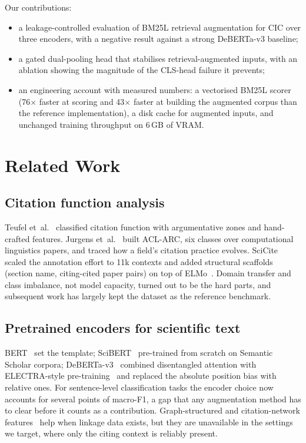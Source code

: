 \documentclass[10pt,twocolumn,twoside]{article}
\begin{document}
Our contributions:
\begin{itemize}
  \item a leakage-controlled evaluation of BM25L retrieval augmentation for
        CIC over three encoders, with a negative result against a strong
        DeBERTa-v3 baseline;
  \item a gated dual-pooling head that stabilises retrieval-augmented inputs,
        with an ablation showing the magnitude of the CLS-head failure it
        prevents;
  \item an engineering account with measured numbers: a vectorised BM25L
        scorer (76$\times$ faster at scoring and 43$\times$ faster at building
        the augmented corpus than the reference implementation), a disk cache
        for augmented inputs, and unchanged training throughput on 6\,GB of
        VRAM.
\end{itemize}

\section{Related Work}\label{sec:related}

\subsection{Citation function analysis}
Teufel et~al.~\cite{teufel2006} classified citation function with
argumentative zones and hand-crafted features. Jurgens et~al.~\cite{jurgens2018}
built ACL-ARC, six classes over computational linguistics papers, and traced
how a field's citation practice evolves. SciCite~\cite{cohan2019} scaled the
annotation effort to 11k contexts and added structural scaffolds (section
name, citing-cited paper pairs) on top of ELMo~\cite{peters2018}. Domain
transfer and class imbalance, not model capacity, turned out to be the hard
parts, and subsequent work has largely kept the dataset as the reference
benchmark.

\subsection{Pretrained encoders for scientific text}
BERT~\cite{devlin2019} set the template; SciBERT~\cite{beltagy2019} pre-trained
from scratch on Semantic Scholar corpora; DeBERTa-v3~\cite{he2021} combined
disentangled attention with ELECTRA-style pre-training~\cite{clark2020} and
replaced the absolute position bias with relative ones. For sentence-level
classification tasks the encoder choice now accounts for several points of
macro-F1, a gap that any augmentation method has to clear before it counts as
a contribution. Graph-structured and citation-network
features~\cite{jurgens2018} help when linkage data exists, but they are
unavailable in the settings we target, where only the citing context is
reliably present.
\end{document}
